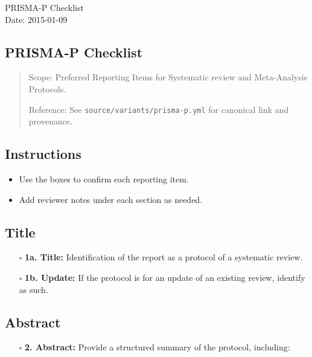 \documentclass[11pt]{article}
\def\tightlist{}
\begin{document}
\begin{center}
{\LARGE PRISMA-P Checklist}\\[4pt]
\normalsize Date: 2015-01-09
\end{center}
\vspace{1em}

\begin{Form}

\section{PRISMA-P Checklist}\label{prisma-p-checklist}

\begin{quote}
Scope: Preferred Reporting Items for Systematic review and Meta-Analysis
Protocols.

Reference: See \texttt{source/variants/prisma-p.yml} for canonical link
and provenance.
\end{quote}

\subsection{Instructions}\label{instructions}

\begin{itemize}
\tightlist
\item
  Use the boxes to confirm each reporting item.
\item
  Add reviewer notes under each section as needed.
\end{itemize}

\subsection{Title}\label{title}

\begin{itemize}
\tightlist
\item[$\square$]
  \textbf{1a. Title:} Identification of the report as a protocol of a
  systematic review.
\item[$\square$]
  \textbf{1b. Update:} If the protocol is for an update of an existing
  review, identify as such.
\end{itemize}

\subsection{Abstract}\label{abstract}

\begin{itemize}
\tightlist
\item[$\square$]
  \textbf{2. Abstract:} Provide a structured summary of the protocol,
  including:


\end{itemize}
\end{Form}
\end{document}
